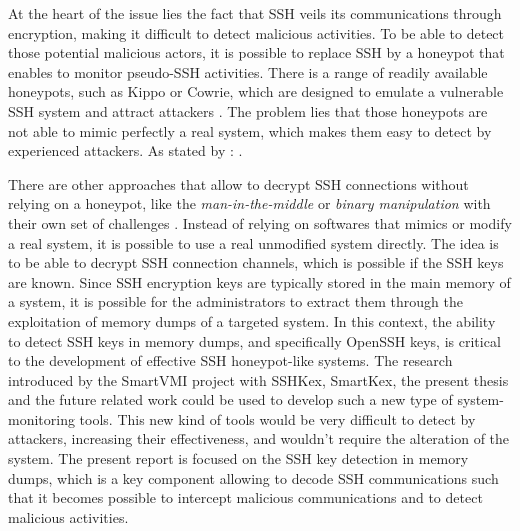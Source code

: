 At the heart of the issue lies the fact that SSH veils its communications through encryption, making it difficult to detect malicious activities. To be able to detect those potential malicious actors, it is possible to replace SSH by a honeypot that enables to monitor pseudo-SSH activities. There is a range of readily available honeypots, such as Kippo or Cowrie, which are designed to emulate a vulnerable SSH system and attract attackers \cite{ClassificationMalware21}. The problem lies that those honeypots are not able to mimic perfectly a real system, which makes them easy to detect by experienced attackers. As stated by :  \cite{SSHHoneypotEffectiveness23}. 

There are other approaches that allow to decrypt SSH connections without relying on a honeypot, like the \textit{man-in-the-middle} or \textit{binary manipulation} with their own set of challenges \cite{SSHkex22}. Instead of relying on softwares that mimics or modify a real system, it is possible to use a real unmodified system directly. The idea is to be able to decrypt SSH connection channels, which is possible if the SSH keys are known. Since SSH encryption keys are typically stored in the main memory of a system, it is possible for the administrators to extract them through the exploitation of memory dumps of a targeted system. In this context, the ability to detect SSH keys in memory dumps, and specifically OpenSSH keys, is critical to the development of effective SSH honeypot-like systems. The research introduced by the SmartVMI project with SSHKex, SmartKex, the present thesis and the future related work could be used to develop such a new type of system-monitoring tools. This new kind of tools would be very difficult to detect by attackers, increasing their effectiveness, and wouldn't require the alteration of the system. The present report is focused on the SSH key detection in memory dumps, which is a key component allowing to decode SSH communications such that it becomes possible to intercept malicious communications and to detect malicious activities.

